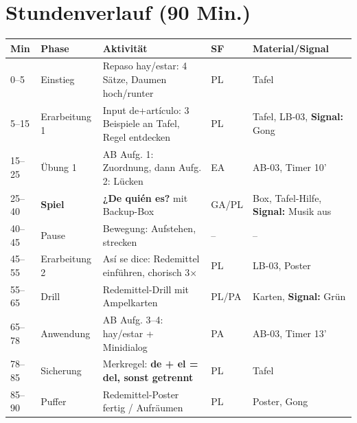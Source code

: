 \documentclass[11pt,a4paper]{article}
\newcommand{\es}[1]{\textbf{#1}}
\begin{document}
\vspace{0.5cm}

\section*{Stundenverlauf (90 Min.)}

\begin{tabular}{|p{1cm}|p{2.2cm}|p{6cm}|p{1cm}|p{2.8cm}|}
\hline
\textbf{Min} & \textbf{Phase} & \textbf{Aktivität} & \textbf{SF} & \textbf{Material/Signal} \\
\hline
0--5 & Einstieg & Repaso hay/estar: 4 Sätze, Daumen hoch/runter & PL & Tafel \\
\hline
5--15 & Erarbeitung 1 & Input de+artículo: 3 Beispiele an Tafel, Regel entdecken & PL & Tafel, LB-03, \newline\textbf{Signal:} Gong \\
\hline
15--25 & Übung 1 & AB Aufg. 1: Zuordnung, dann Aufg. 2: Lücken & EA & AB-03, Timer 10' \\
\hline
25--40 & \textbf{Spiel} & \es{¿De quién es?} mit Backup-Box & GA/PL & Box, Tafel-Hilfe, \newline\textbf{Signal:} Musik aus \\
\hline
40--45 & Pause & Bewegung: Aufstehen, strecken & -- & -- \\
\hline
45--55 & Erarbeitung 2 & Así se dice: Redemittel einführen, chorisch 3× & PL & LB-03, Poster \\
\hline
55--65 & Drill & Redemittel-Drill mit Ampelkarten & PL/PA & Karten, \newline\textbf{Signal:} Grün \\
\hline
65--78 & Anwendung & AB Aufg. 3--4: hay/estar + Minidialog & PA & AB-03, Timer 13' \\
\hline
78--85 & Sicherung & Merkregel: \es{de + el = del, sonst getrennt} & PL & Tafel \\
\hline
85--90 & Puffer & Redemittel-Poster fertig / Aufräumen & PL & Poster, Gong \\
\hline
\end{tabular}

\vspace{0.5cm}

\end{document}
